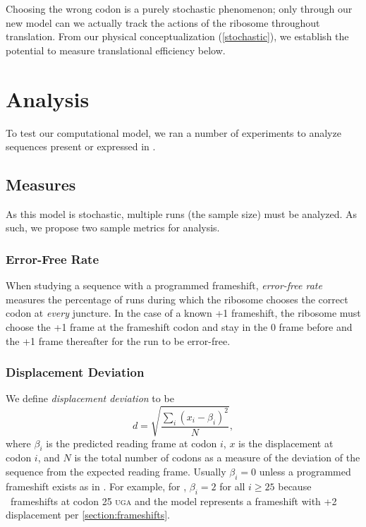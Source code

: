 \documentclass[twocolumn]{article}
\begin{document}
Choosing the wrong codon is a purely stochastic phenomenon; only through our new
model can we actually track the actions of the ribosome throughout
translation. From our physical conceptualization (\autoref{stochastic}),
we establish the potential to measure translational efficiency below.

\section{Analysis}
To test our computational model, we ran a number of
experiments to analyze sequences present or expressed in \ecoli.

\subsection{Measures}
\label{section:metrics}

As this model is stochastic, multiple runs (the sample size) must be analyzed.
As such, we propose two sample metrics for analysis.

\subsubsection{Error-Free Rate}
\label{section:efr}
When studying a
sequence with a programmed frameshift, \emph{error-free rate} measures the percentage of runs 
during which the ribosome chooses the correct codon
at \emph{every} juncture.  In the case of a known +1 frameshift, the ribosome must
choose the +1 frame at the frameshift codon and stay in the 0 frame before
and the +1 frame thereafter for the run to be error-free.

\subsubsection{Displacement Deviation}
\label{section:deviation}

We define \emph{displacement deviation} to be
\begin{equation}
    d = \sqrt{\frac{\sum_i (x_i - \beta_i)^2}{N}},
\end{equation}
where $\beta_i$ is the predicted reading frame at codon $i$, $x$ is
the displacement at codon $i$, and $N$ is the total number of codons
as a measure of the deviation of the sequence from the expected
reading frame.  Usually $\beta_i = 0$ unless a programmed frameshift
exists as in \prfB.  For example, for \prfB, $\beta_i = 2$
for all $i \geq 25$ because \prfB\ frameshifts at codon 25
\textsc{uga} and the model represents a frameshift with +2
displacement per \autoref{section:frameshifts}.
\end{document}
